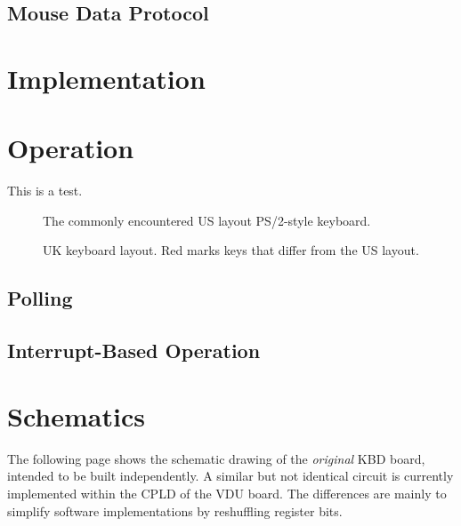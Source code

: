 \subsection{Mouse Data Protocol}

\section{Implementation}

\section{Operation}

\begin{turn}{90}
This is a test.
\end{turn}

\begin{figure}
  \centering
  \ifxetex
  \else
  \fi
  \caption{\label{fig:kbd-us} The commonly encountered  US layout PS/2-style keyboard.}
\end{figure}

\begin{figure}
  \centering
  \ifxetex
  \else
  \fi
  \caption{\label{fig:kbd-uk} UK keyboard layout. Red marks keys that differ from the US layout.}
\end{figure}

\subsection{Polling}

\subsection{Interrupt-Based Operation}

\htmlbreak
\section{Schematics}

The following page shows the schematic drawing of the {\em original\/} KBD
board, intended to be built independently. A similar but not identical circuit
is currently implemented within the CPLD of the VDU board. The differences are
mainly to simplify software implementations by reshuffling register bits.

\cleardoublepage
{}
